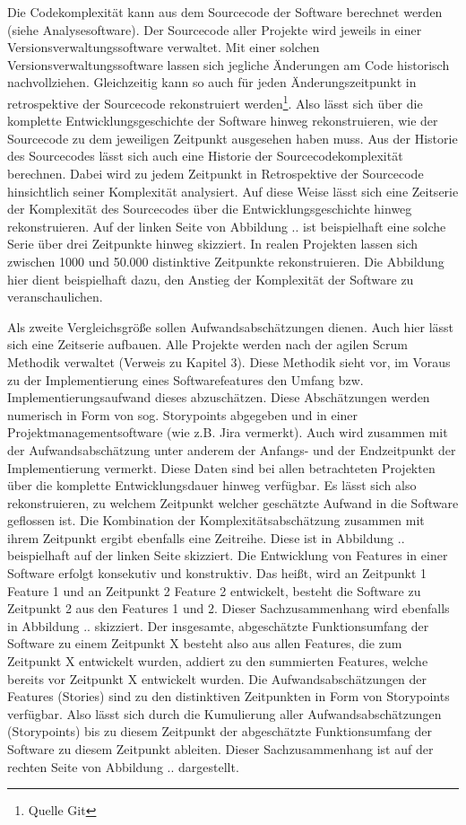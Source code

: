 Die Codekomplexität kann aus dem Sourcecode der Software berechnet
werden (siehe Analysesoftware). Der Sourcecode aller Projekte wird
jeweils in einer Versionsverwaltungssoftware verwaltet. Mit einer
solchen Versionsverwaltungssoftware lassen sich jegliche Änderungen am
Code historisch nachvollziehen. Gleichzeitig kann so auch für jeden
Änderungszeitpunkt in retrospektive der Sourcecode rekonstruiert
werden\footnote{Quelle Git}. Also lässt sich über die komplette
Entwicklungsgeschichte der Software hinweg rekonstruieren, wie der
Sourcecode zu dem jeweiligen Zeitpunkt ausgesehen haben muss. Aus der
Historie des Sourcecodes lässt sich auch eine Historie der
Sourcecodekomplexität berechnen. Dabei wird zu jedem Zeitpunkt in
Retrospektive der Sourcecode hinsichtlich seiner Komplexität analysiert.
Auf diese Weise lässt sich eine Zeitserie der Komplexität des
Sourcecodes über die Entwicklungsgeschichte hinweg rekonstruieren. Auf
der linken Seite von Abbildung .. ist beispielhaft eine solche Serie
über drei Zeitpunkte hinweg skizziert. In realen Projekten lassen sich
zwischen 1000 und 50.000 distinktive Zeitpunkte rekonstruieren. Die
Abbildung hier dient beispielhaft dazu, den Anstieg der Komplexität der
Software zu veranschaulichen.

Als zweite Vergleichsgröße sollen Aufwandsabschätzungen dienen. Auch
hier lässt sich eine Zeitserie aufbauen. Alle Projekte werden nach der
agilen Scrum Methodik verwaltet (Verweis zu Kapitel 3). Diese Methodik
sieht vor, im Voraus zu der Implementierung eines Softwarefeatures den
Umfang bzw. Implementierungsaufwand dieses abzuschätzen. Diese
Abschätzungen werden numerisch in Form von sog. Storypoints abgegeben
und in einer Projektmanagementsoftware (wie z.B. Jira vermerkt). Auch
wird zusammen mit der Aufwandsabschätzung unter anderem der Anfangs- und
der Endzeitpunkt der Implementierung vermerkt. Diese Daten sind bei
allen betrachteten Projekten über die komplette Entwicklungsdauer hinweg
verfügbar. Es lässt sich also rekonstruieren, zu welchem Zeitpunkt
welcher geschätzte Aufwand in die Software geflossen ist. Die
Kombination der Komplexitätsabschätzung zusammen mit ihrem Zeitpunkt
ergibt ebenfalls eine Zeitreihe. Diese ist in Abbildung .. beispielhaft
auf der linken Seite skizziert. Die Entwicklung von Features in einer
Software erfolgt konsekutiv und konstruktiv. Das heißt, wird an
Zeitpunkt 1 Feature 1 und an Zeitpunkt 2 Feature 2 entwickelt, besteht
die Software zu Zeitpunkt 2 aus den Features 1 und 2. Dieser
Sachzusammenhang wird ebenfalls in Abbildung .. skizziert. Der
insgesamte, abgeschätzte Funktionsumfang der Software zu einem Zeitpunkt
X besteht also aus allen Features, die zum Zeitpunkt X entwickelt
wurden, addiert zu den summierten Features, welche bereits vor Zeitpunkt
X entwickelt wurden. Die Aufwandsabschätzungen der Features (Stories)
sind zu den distinktiven Zeitpunkten in Form von Storypoints verfügbar.
Also lässt sich durch die Kumulierung aller Aufwandsabschätzungen
(Storypoints) bis zu diesem Zeitpunkt der abgeschätzte Funktionsumfang
der Software zu diesem Zeitpunkt ableiten. Dieser Sachzusammenhang ist
auf der rechten Seite von Abbildung .. dargestellt.

